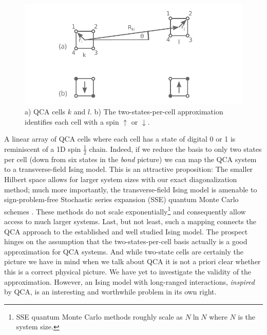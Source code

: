 %
\begin{figure}
  \center
  \includegraphics{ising}
  \caption{a) QCA cells $k$ and $l$. b) The two-states-per-cell approximation
  identifies each cell with a spin $\uparrow$ or $\downarrow$.}
  \label{fig:cells2}
\end{figure}
%
A linear array of QCA cells where each cell has a state of digital 0 or 1 is
reminiscent of a 1D spin $\frac{1}{2}$ chain. Indeed, if we reduce the basis to
only two states per cell (down from six states in the \emph{bond} picture) we
can map the QCA system to a transverse-field Ising model. This is an attractive
proposition: The smaller Hilbert space allows for larger system sizes with our
exact diagonalization method; much more importantly, the transverse-field Ising
model is amenable to sign-problem-free Stochastic series expansion (SSE) quantum
Monte Carlo schemes \cite{Sandvik2003}. These methods do not scale
exponentially\footnote{SSE quantum Monte Carlo methods roughly scale as $N \ln
N$ where $N$ is the system size.} and consequently allow access to much larger
systems. Last, but not least, such a mapping connects the QCA approach to the
established and well studied Ising model. The prospect hinges on the assumption
that the two-states-per-cell basis actually is a good approximation for QCA
systems. And while two-state cells are certainly the picture we have in mind
when we talk about QCA it is not a priori clear whether this is a correct
physical picture. We have yet to investigate the validity of the approximation.
However, an Ising model with long-ranged interactions, \emph{inspired} by QCA,
is an interesting and worthwhile problem in its own right.

